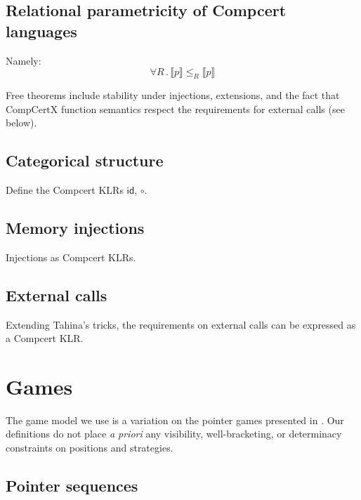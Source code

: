 \documentclass[acmsmall,anonymous]{acmart}
\newcommand{\kw}[1]{\ensuremath{ \textsf{#1} }}
\begin{document}

\subsection{Relational parametricity of Compcert languages} %

Namely:
\[ \forall R \,.\, \llbracket p \rrbracket \le_R \llbracket p \rrbracket \]

Free theorems include
stability under injections, extensions,
and the fact that CompCertX function semantics
respect the requirements for external calls (see below).


\subsection{Categorical structure} %

Define the Compcert KLRs \kw{id}, $\circ$.


\subsection{Memory injections} %

Injections as Compcert KLRs.


\subsection{External calls} %

Extending Tahina's tricks,
the requirements on
external calls
can be expressed as a Compcert KLR.



\newpage
\section{Games} %

The game model we use is a variation on
the pointer games presented in \citep{gamesem99}.
Our definitions
do not place \emph{a priori}
any visibility, well-bracketing, or determinacy
constraints on positions and strategies.

\subsection{Pointer sequences} %
\end{document}
